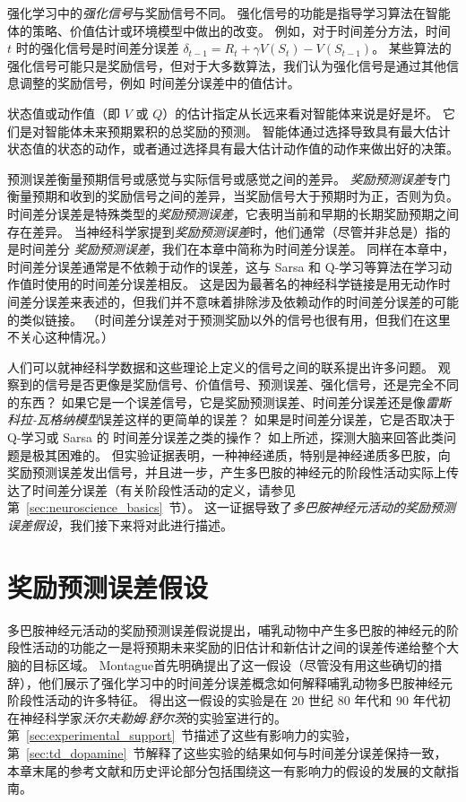 强化学习中的\textit{强化信号}与奖励信号不同。
强化信号的功能是指导学习算法在智能体的策略、价值估计或环境模型中做出的改变。
例如，对于时间差分方法，时间 $ t $ 时的强化信号是时间差分误差 $ \delta_{t-1} = R_t + \gamma V(S_t) - V(S_{t-1})$。
某些算法的强化信号可能只是奖励信号，但对于大多数算法，我们认为强化信号是通过其他信息调整的奖励信号，例如 时间差分误差中的值估计。


状态值或动作值（即 $ V $ 或 $ Q $）的估计指定从长远来看对智能体来说是好是坏。
它们是对智能体未来预期累积的总奖励的预测。
智能体通过选择导致具有最大估计状态值的状态的动作，或者通过选择具有最大估计动作值的动作来做出好的决策。


预测误差衡量预期信号或感觉与实际信号或感觉之间的差异。
\textit{奖励预测误差}专门衡量预期和收到的奖励信号之间的差异，当奖励信号大于预期时为正，否则为负。 
时间差分误差是特殊类型的\textit{奖励预测误差}，它表明当前和早期的长期奖励预期之间存在差异。
当神经科学家提到\textit{奖励预测误差}时，他们通常（尽管并非总是）指的是时间差分 \textit{奖励预测误差}，我们在本章中简称为时间差分误差。
同样在本章中，时间差分误差通常是不依赖于动作的误差，这与 Sarsa 和 Q-学习等算法在学习动作值时使用的时间差分误差相反。
这是因为最著名的神经科学链接是用无动作时间差分误差来表述的，但我们并不意味着排除涉及依赖动作的时间差分误差的可能的类似链接。
（时间差分误差对于预测奖励以外的信号也很有用，但我们在这里不关心这种情况\cite{modayil2014prediction}。）


人们可以就神经科学数据和这些理论上定义的信号之间的联系提出许多问题。
观察到的信号是否更像是奖励信号、价值信号、预测误差、强化信号，还是完全不同的东西？
如果它是一个误差信号，它是奖励预测误差、时间差分误差还是像\textit{雷斯科拉-瓦格纳模型}误差这样的更简单的误差？
如果是时间差分误差，它是否取决于 Q-学习或 Sarsa 的 时间差分误差之类的操作？
如上所述，探测大脑来回答此类问题是极其困难的。
但实验证据表明，一种神经递质，特别是神经递质多巴胺，向奖励预测误差发出信号，并且进一步，产生多巴胺的神经元的阶段性活动实际上传达了时间差分误差（有关阶段性活动的定义，请参见第~\ref{sec:neuroscience_basics}~节）。
这一证据导致了\textit{多巴胺神经元活动的奖励预测误差假设}，我们接下来将对此进行描述。


\section{奖励预测误差假设}

多巴胺神经元活动的奖励预测误差假说提出，哺乳动物中产生多巴胺的神经元的阶段性活动的功能之一是将预期未来奖励的旧估计和新估计之间的误差传递给整个大脑的目标区域。
Montague\cite{montague1996framework}首先明确提出了这一假设（尽管没有用这些确切的措辞），他们展示了强化学习中的时间差分误差概念如何解释哺乳动物多巴胺神经元阶段性活动的许多特征。
得出这一假设的实验是在 20 世纪 80 年代和 90 年代初在神经科学家\textit{沃尔夫勒姆$\cdot$舒尔茨}的实验室进行的。
第~\ref{sec:experimental_support}~节描述了这些有影响力的实验，第~\ref{sec:td_dopamine}~节解释了这些实验的结果如何与时间差分误差保持一致，本章末尾的参考文献和历史评论部分包括围绕这一有影响力的假设的发展的文献指南。


